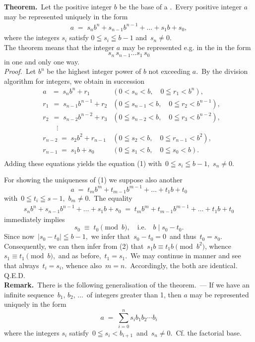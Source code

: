 \documentclass[12pt]{article}
\theoremstyle{definition}
\begin{document}
\textbf{Theorem.}\, Let the positive integer $b$ be the base of a .\, Every positive integer $a$ may be represented uniquely in the form
\begin{align}
a \;=\; s_nb^n+s_{n-1}b^{n-1}+\ldots+s_1b+s_0,
\end{align}
where the integers $s_i$ satisfy\; $0 \leqq s_i \leqq b\!-\!1$\; and\, $s_n \neq 0$.\\

The theorem means that the integer $a$ may be represented e.g. in the  in the form
$$s_n\,s_{n-1}\ldots s_1\,s_0$$
in one and only one way.\\

\emph{Proof.}\, Let $b^n$ be the highest integer power of $b$ not exceeding $a$.\, By the division algorithm for integers, we obtain in succession
\begin{align*}
&a \;\;\,=\; s_nb^n+r_1 \qquad     &(0 < s_n < b, \quad 0 \leqq r_1 < b^n),\\
&r_1 \,\;=\; s_{n-1}b^{n-1}+r_2  &(0 \leqq s_{n-1} < b, \quad 0 \leqq r_2 < b^{n-1}),\\
&r_2 \,\;=\; s_{n-2}b^{n-2}+r_3  &(0 \leqq s_{n-2} < b, \quad 0 \leqq r_3 < b^{n-2}),\\
    &\qquad \vdots\\
&r_{n-2} \;=\; s_2b^2+r_{n-1} &(0 \leqq s_2 < b, \quad 0 \leqq r_{n-1} < b^2),\\
&r_{n-1} \;=\; s_1b+s_0       &(0 \leqq s_1 < b, \quad 0 \leqq s_0 < b).\\
\end{align*}
Adding these equations yields the equation (1) with\, $0\leqq s_i \leqq b\!-\!1$,\, $s_n \neq 0$.

For showing the uniqueness of (1) we suppose also another 
$$a \;=\; t_mb^m+t_{m-1}b^{m-1}+\ldots+t_1b+t_0$$
with\, $0 \leqq t_i \leqq s\!-\!1$,\, $b_m \neq 0$.\, The equality
\begin{align}
s_nb^n+s_{n-1}b^{n-1}+\ldots+s_1b+s_0 \;=\; t_mb^m+t_{m-1}b^{m-1}+\ldots+t_1b+t_0
\end{align}
immediately implies
$$s_0 \;\equiv\; t_0 \pmod b, \quad \mbox{i.e.} \quad b \mid s_0\!-\!t_0.$$
Since now\, $|s_0\!-\!t_0| \leqq b\!-\!1$,\, we infer that\, $s_0\!-\!t_0 = 0$\, and thus\, 
$t_0 = s_0$.\, Consequently, we can then infer from (2) that\, $s_1b \equiv t_1b \pmod {b^2}$, whence\, 
$s_1 \equiv t_1 \pmod b$,\, and as before,\, $t_1 = s_1$.\, We may continue in  manner and see that always\,
$t_i = s_i$, whence also\, $m = n$.\, Accordingly, the both  are identical. Q.E.D.\\

\textbf{Remark.}\, There is the following generalisation of the theorem.\, --- If we have an infinite sequence 
\,$b_1,\,b_2,\,\ldots$\, of integers greater than 1, then $a$ may be represented uniquely in the form
$$a \;=\; \sum_{i=0}^n s_ib_1b_2\cdots b_i$$
where the integers $s_i$ satisfy\, $0 \leqq s_i < b_{i+1}$\, and\, $s_n \neq 0$.\, Cf. the factorial base.
\end{document}

